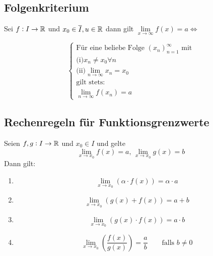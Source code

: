 \subsection{Folgenkriterium}
Sei $f: I \rightarrow \mathbb{R}$ und $x_0 \in \overline{I}, u \in \mathbb{R}$ dann gilt
$\lim\limits_{x \rightarrow \infty} f(x) = a \Leftrightarrow$

\begin{equation*}
    \begin{cases}
        \text{Für eine beliebe Folge } {(x_n)}_{n=1}^\infty \text{ mit}\\
        \text{(i)} x_n \neq x_0 \forall n\\
        \text{(ii)} \lim\limits_{n \rightarrow \infty} x_n = x_0\\
        \text{gilt stets:}\\
        \lim\limits_{n \rightarrow \infty} f(x_n) = a
    \end{cases}
\end{equation*}

\subsection{Rechenregeln für Funktionsgrenzwerte}
Seien $f, g: I \rightarrow \mathbb{R}$ und $x_0 \in I$ und gelte
\begin{equation*}
    \lim_{x \rightarrow x_0} f(x) = a \text{, }
    \lim_{x \rightarrow x_0} g(x) = b
\end{equation*}
Dann gilt:
\begin{enumerate}[label= (\alph*)]
    \item
        \begin{equation*}
            \lim_{x \rightarrow x_0} (\alpha \cdot f(x)) = \alpha \cdot a
        \end{equation*}
    \item
        \begin{equation*}
            \lim_{x \rightarrow x_0} (g(x) + f(x)) = a + b
        \end{equation*}
    \item
        \begin{equation*}
            \lim_{x \rightarrow x_0} (g(x) \cdot f(x)) = a \cdot b
        \end{equation*}
    \item
        \begin{equation*}
            \lim_{x \rightarrow x_0} \left(\frac{f(x)}{g(x)}\right) = \frac{a}{b}
            \qquad\text{falls } b \neq 0
        \end{equation*}
\end{enumerate}

